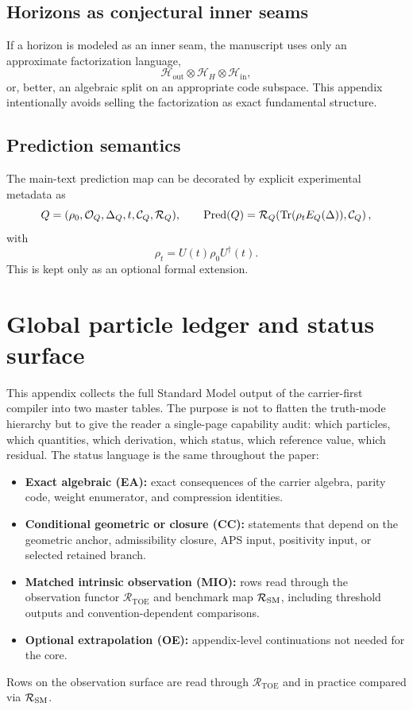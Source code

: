 \subsection{Horizons as conjectural inner seams}

If a horizon is modeled as an inner seam, the manuscript uses only an approximate factorization language,
\[
\mathcal H_{\mathrm{out}}\otimes\mathcal H_H\otimes\mathcal H_{\mathrm{in}},
\]
or, better, an algebraic split on an appropriate code subspace. This appendix intentionally avoids selling the factorization as exact fundamental structure.

\subsection{Prediction semantics}

The main-text prediction map can be decorated by explicit experimental metadata as
\[
Q=(\rho_0,\mathcal O_Q,\Delta_Q,t,\mathcal C_Q,\mathcal R_Q),
\qquad
\operatorname{Pred}(Q)=\mathcal R_Q\!\left(\operatorname{Tr}(\rho_tE_Q(\Delta)),\mathcal C_Q\right),
\]
with
\[
\rho_t=U(t)\rho_0U^\dagger(t).
\]
This is kept only as an optional formal extension.

\section{Global particle ledger and status surface}
\label{app:global-particle-ledger}

This appendix collects the full Standard Model output of the carrier-first compiler into two
master tables. The purpose is not to flatten the truth-mode hierarchy but to give the reader a
single-page capability audit: which particles, which quantities, which derivation, which status,
which reference value, which residual. The status language is the same throughout the paper:

\begin{tcolorbox}[colback=tfptblue!2, colframe=tfptblue!50, breakable,
    title={Status legend for the particle ledger}, colbacktitle=tfptblue!70]
\begin{itemize}[leftmargin=1.5em, topsep=3pt, itemsep=2pt]
\item \textbf{Exact algebraic (EA):} exact consequences of the carrier algebra, parity code,
      weight enumerator, and compression identities.
\item \textbf{Conditional geometric or closure (CC):} statements that depend on the geometric
      anchor, admissibility closure, APS input, positivity input, or selected retained branch.
\item \textbf{Matched intrinsic observation (MIO):} rows read through the observation functor
      $\mathcal R_{\mathrm{TOE}}$ and benchmark map $\mathcal R_{\mathrm{SM}}$, including threshold
      outputs and convention-dependent comparisons.
\item \textbf{Optional extrapolation (OE):} appendix-level continuations not needed for the core.
\end{itemize}
Rows on the observation surface are read through $\mathcal R_{\mathrm{TOE}}$ and in practice
compared via $\mathcal R_{\mathrm{SM}}$.
\end{tcolorbox}

